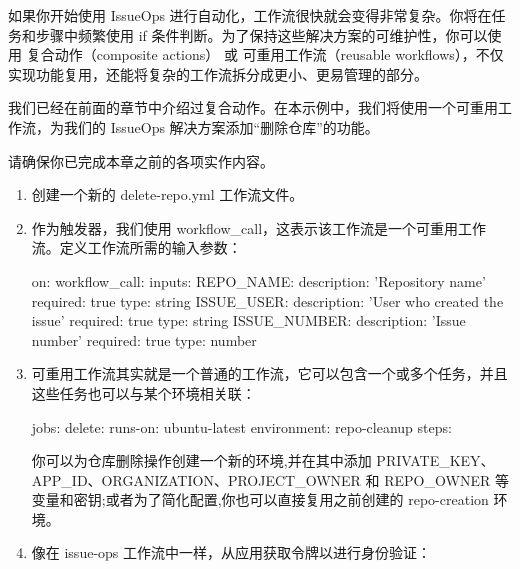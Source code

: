 如果你开始使用 IssueOps 进行自动化，工作流很快就会变得非常复杂。你将在任务和步骤中频繁使用 if 条件判断。为了保持这些解决方案的可维护性，你可以使用 复合动作（composite actions） 或 可重用工作流（reusable workflows），不仅实现功能复用，还能将复杂的工作流拆分成更小、更易管理的部分。

我们已经在前面的章节中介绍过复合动作。在本示例中，我们将使用一个可重用工作流，为我们的 IssueOps 解决方案添加“删除仓库”的功能。


请确保你已完成本章之前的各项实作内容。


\begin{enumerate}
\item 
创建一个新的 delete-repo.yml 工作流文件。

\item 
作为触发器，我们使用 workflow\_call，这表示该工作流是一个可重用工作流。定义工作流所需的输入参数：

\begin{shell}
on:
  workflow_call:
    inputs:
      REPO_NAME:
        description: 'Repository name'
        required: true
        type: string
      ISSUE_USER:
        description: 'User who created the issue'
        required: true
        type: string
      ISSUE_NUMBER:
        description: 'Issue number'
        required: true
        type: number
\end{shell}

\item 
可重用工作流其实就是一个普通的工作流，它可以包含一个或多个任务，并且这些任务也可以与某个环境相关联：

\begin{shell}
  jobs:
    delete:
      runs-on: ubuntu-latest
      environment: repo-cleanup
      steps:
\end{shell}

你可以为仓库删除操作创建一个新的环境,并在其中添加 PRIVATE\_KEY、APP\_ID、ORGANIZATION、PROJECT\_OWNER 和 REPO\_OWNER 等变量和密钥;或者为了简化配置,你也可以直接复用之前创建的 repo-creation 环境。

\item 
像在 issue-ops 工作流中一样，从应用获取令牌以进行身份验证：



\end{enumerate}
